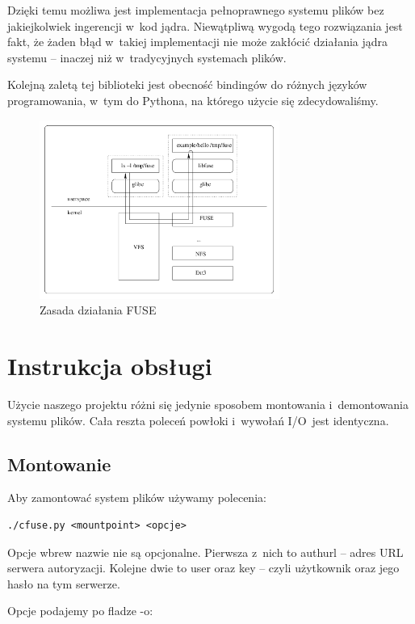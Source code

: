 Dzięki temu możliwa jest implementacja pełnoprawnego systemu plików bez
jakiejkolwiek ingerencji w~kod jądra. Niewątpliwą wygodą tego rozwiązania
jest fakt, że żaden błąd w~takiej implementacji nie może zakłócić działania
jądra systemu -- inaczej niż w~tradycyjnych systemach plików.

Kolejną zaletą tej biblioteki jest obecność bindingów do różnych języków
programowania, w~tym do Pythona, na którego użycie się zdecydowaliśmy.

\begin{figure}
    \centering
    \includegraphics[width=0.7\textwidth]{img/fuse_structure.png}
    \caption{Zasada działania FUSE}
\end{figure}

\section{Instrukcja obsługi}
Użycie naszego projektu różni się jedynie sposobem montowania i~demontowania
systemu plików. Cała reszta poleceń powłoki i~wywołań I/O~jest identyczna.

\subsection{Montowanie}

Aby zamontować system plików używamy polecenia:

\begin{verbatim}
./cfuse.py <mountpoint> <opcje>
\end{verbatim}

Opcje wbrew nazwie nie są opcjonalne. Pierwsza z~nich to authurl -- adres URL
serwera autoryzacji. Kolejne dwie to user oraz key -- czyli użytkownik oraz
jego hasło na tym serwerze.

Opcje podajemy po fladze -o:

